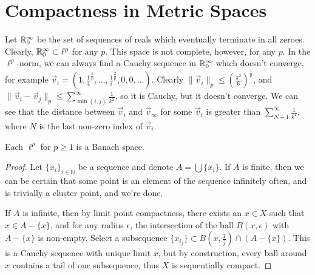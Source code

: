
\section*{Compactness in Metric Spaces}





Let $\mathbb{R}_0^\infty$ be the set of sequences of reals which eventually terminate in all zeroes.  Clearly, $\mathbb{R}_0^\infty\subset \ell^p$ for any $p$.  This space is not complete, however, for any $p$.  In the $\ell^p$-norm, we can always find a Cauchy  sequence in $\mathbb{R}^\infty_0$ which doesn't converge, for example $\vec{v}_i= (1,\frac{1}{4}^{\frac{1}{p}}, \dots,\frac{1}{i}^\frac{2}{p}, 0,0,\dots)$.  Clearly $\|\vec{v}_i\|_p \leq \left(\frac{\pi^2}{6}\right)^\frac{1}{p}$, and $\|\vec{v}_i - \vec{v}_j \|_p \leq \sum\limits_{\min(i,j)}^\infty \frac{1}{k^2}$, so it is Cauchy, but it doesn't converge.  We can see that the distance between $\vec{v}_i$ and $\vec{v}_\infty$ for some $\vec{v}_i$ is greater than $\sum\limits_{N+1}^\infty \frac{1}{k^2}$, where $N$ is the last non-zero index of $\vec{v}_i$.




Each $\ell^p$ for $p\geq 1$ is a Banach space.


\begin{proof}
	
	Let $\{x_i\}_{i\in\mathbb{N}}$ be a sequence and denote $A=\bigcup\{x_i\}$.  If $A$ is finite, then we can be certain that some point is an element of the sequence infinitely often, and is trivially a cluster point, and we're done.
	
	If $A$ is infinite, then by limit point compactness, there exists an $x\in X$ such that $x\in\overline{A{-}\{x\}}$, and for any radius $\epsilon$, the intersection of the ball $B(x,\epsilon)$ with $A{-}\{x\}$ is non-empty.  Select a subsequence $\{x_{i_j}\}\subset B(x,\frac{1}{j})\cap (A{-}\{x\})$.  This is a Cauchy sequence with unique limit $x$, but by construction, every ball around $x$ contains a tail of our subsequence, thus $X$ is sequentially compact.
	
	
\end{proof}


